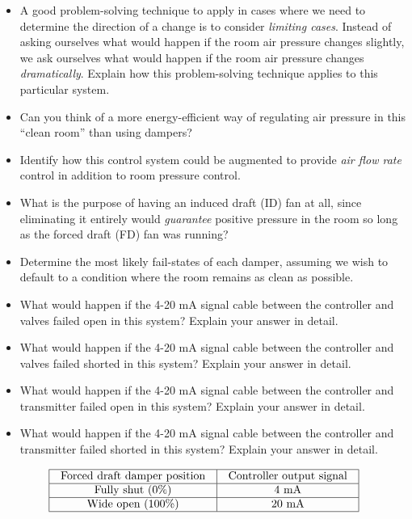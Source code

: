 \begin{itemize}
\item{} A good problem-solving technique to apply in cases where we need to determine the direction of a change is to consider {\it limiting cases}.  Instead of asking ourselves what would happen if the room air pressure changes slightly, we ask ourselves what would happen if the room air pressure changes {\it dramatically}.  Explain how this problem-solving technique applies to this particular system.
\item{} Can you think of a more energy-efficient way of regulating air pressure in this ``clean room'' than using dampers?
\item{} Identify how this control system could be augmented to provide {\it air flow rate} control in addition to room pressure control.
\item{} What is the purpose of having an induced draft (ID) fan at all, since eliminating it entirely would {\it guarantee} positive pressure in the room so long as the forced draft (FD) fan was running?
\item{} Determine the most likely fail-states of each damper, assuming we wish to default to a condition where the room remains as clean as possible.
\item{} What would happen if the 4-20 mA signal cable between the controller and valves failed open in this system?  Explain your answer in detail.
\item{} What would happen if the 4-20 mA signal cable between the controller and valves failed shorted in this system?  Explain your answer in detail.
\item{} What would happen if the 4-20 mA signal cable between the controller and transmitter failed open in this system?  Explain your answer in detail.
\item{} What would happen if the 4-20 mA signal cable between the controller and transmitter failed shorted in this system?  Explain your answer in detail.
\end{itemize}









$$\vbox{\offinterlineskip
\halign{\strut
\vrule \quad\hfil # \ \hfil & 
\vrule \quad\hfil # \ \hfil \vrule \cr
\noalign{\hrule}
%
Forced draft damper position & Controller output signal \cr
%
\noalign{\hrule}
%
Fully shut (0\%) & 4 mA \cr
%
\noalign{\hrule}
%
Wide open (100\%) & 20 mA \cr
%
\noalign{\hrule}
} %
}$$ %

